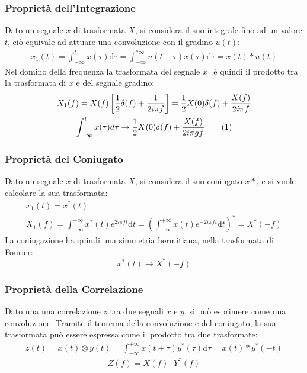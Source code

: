 \documentclass{article}
\newcommand{\df}{\mathrm{d}}
\newcommand{\tageq}{\tag{\stepcounter{equation}\theequation}}
\numberwithin{equation}{subsection}
\begin{document}
\subsubsection{Proprietà dell'Integrazione}

Dato un segnale $x$ di trasformata $X$, si considera il suo integrale fino ad un valore $t$, ciò equivale ad attuare una convoluzione con il gradino $u(t)$:
\begin{gather*}
    x_1(t)=\displaystyle\int_{-\infty}^{t}x(\tau)\df\tau=\int_{-\infty}^{*\infty}u(t-\tau)x(\tau)\df\tau=x(t)*u(t)
\end{gather*}
Nel domino della frequenza la trasformata del segnale $x_1$ è quindi il prodotto tra la trasformata di $x$ e del segnale gradino:
\begin{gather*}
    X_1(f)=X(f)\left[\displaystyle\frac{1}{2}\delta(f)+\frac{1}{2i\pi f}\right]=\frac{1}{2}X(0)\delta(f)+\frac{X(f)}{2i\pi f}\\
    \displaystyle\int_{-\infty}^tx(\tau)d\tau\to\frac{1}{2}X(0)\delta(f)+\frac{X(f)}{2i\pi gf}\tageq
\end{gather*}

\subsubsection{Proprietà del Coniugato}

Dato un segnale $x$ di trasformata $X$, si considera il suo coniugato $x*$, e si vuole calcolare la sua trasformata:
\begin{gather*}
    x_1(t)=x^*(t)\\
    X_1(f)=\displaystyle\int_{-\infty}^{+\infty}x^*(t)e^{2i\pi ft}\df t=\left(\int_{-\infty}^{+\infty}x(t)e^{-2i\pi ft}\df t\right)^*=X^*(-f)
\end{gather*}
La coniugazione ha quindi una simmetria hermitiana, nella trasformata di Fourier: 
\begin{equation}
    x^*(t)\to X^*(-f)
\end{equation}

\subsubsection{Proprietà della Correlazione}

Dato una una correlazione $z$ tra due segnali $x$ e $y$, si può esprimere come una convoluzione. Tramite il teorema della convoluzione e del coniugato, la sua trasformata può 
essere espressa come il prodotto tra due trasformate: 
\begin{gather*}
    z(t)=x(t)\otimes y(t)=\displaystyle\int_{-\infty}^{+\infty}x(t+\tau)y^*(\tau)\df\tau=x(t)*y^*(-t)
\end{gather*}
\begin{equation}
    Z(f)=X(f)\cdot Y^*(f)
\end{equation}
\end{document}
